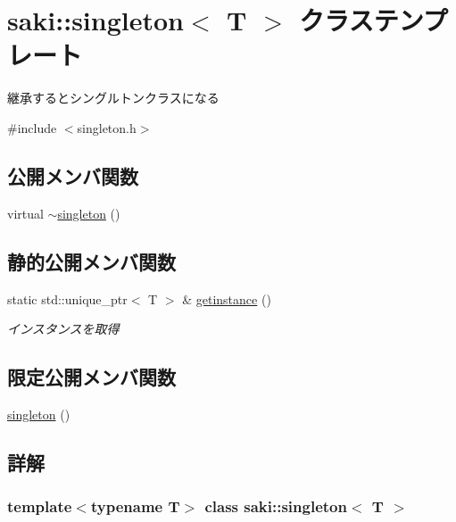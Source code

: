 \hypertarget{classsaki_1_1singleton}{}\section{saki\+:\+:singleton$<$ T $>$ クラステンプレート}
\label{classsaki_1_1singleton}


継承するとシングルトンクラスになる  




{\ttfamily \#include $<$singleton.\+h$>$}

\subsection*{公開メンバ関数}
\begin{DoxyCompactItemize}
\item 
virtual \mbox{\hyperlink{classsaki_1_1singleton_a7e18a317dec7a4658f6d3376f2dd3ebd}{$\sim$singleton}} ()
\end{DoxyCompactItemize}
\subsection*{静的公開メンバ関数}
\begin{DoxyCompactItemize}
\item 
static std\+::unique\+\_\+ptr$<$ T $>$ \& \mbox{\hyperlink{classsaki_1_1singleton_a17071f9daca33c8dd4287dffc49457ec}{getinstance}} ()
\begin{DoxyCompactList}\small\item\em インスタンスを取得 \end{DoxyCompactList}\end{DoxyCompactItemize}
\subsection*{限定公開メンバ関数}
\begin{DoxyCompactItemize}
\item 
\mbox{\hyperlink{classsaki_1_1singleton_a511f5d5e51fdac173fa0dbea858f5ee0}{singleton}} ()
\end{DoxyCompactItemize}


\subsection{詳解}
\subsubsection*{template$<$typename T$>$\newline
class saki\+::singleton$<$ T $>$}

